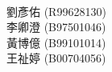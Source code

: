 \documentclass[12pt]{article}
\begin{document}
\begin{CJK}{UTF8}{cwmb}
\renewcommand{\figurename}{圖}

\voffset=-1cm
\textwidth=5.6in
\textheight=9.2in

\newenvironment{num}
 {\leftmargini=6mm\leftmarginii=8mm
  \begin{enumerate}\itemsep=-2pt}
 {\end{enumerate}}

\newenvironment{sol}
 {\begin{quote}\mbox{}\llap{\color{blue}{解答:}\rule{10mm}{0pt}}\hspace*{-4pt}}{\end{quote}}


\thispagestyle{empty}
\fontsize{12}{20pt}\selectfont
\begin{center}
{\large{}}\\[3mm]
劉彥佑 (R99628130)\\
李卿澄 (B97501046)\\
黃博億 (B99101014)\\
王祉婷 (B00704056)
\end{center}


\end{CJK}
\end{document}
